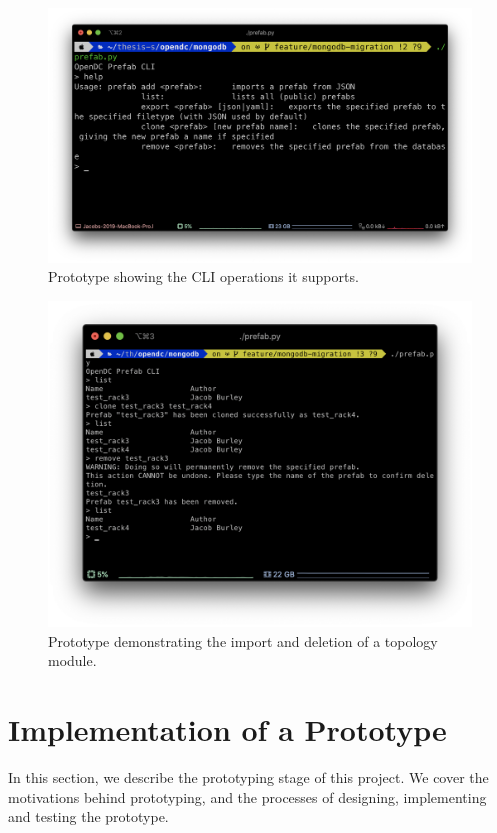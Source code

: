 \documentclass[11pt]{article}
\begin{document}
\begin{figure}[]
	\centering
	\includegraphics[width=\textwidth]{prototype3.png}
	\caption[Prototype showing the \texttt{CLI} operations it supports]{Prototype showing the CLI operations it supports.}
	\label{fig:prototype1}
\end{figure}
\begin{figure}[]
	\centering
	\includegraphics[width=\textwidth]{prototype2.png}
	\caption[Prototype demonstrating the import and deletion of a topology module]{Prototype demonstrating the import and deletion of a topology module.}
	\label{fig:prototype2}
\end{figure}


\section{Implementation of a Prototype} \label{sec:prototype}
	In this section, we describe the prototyping stage of this project.
	We cover the motivations behind prototyping, and the processes of designing, implementing and testing the prototype.
\end{document}
